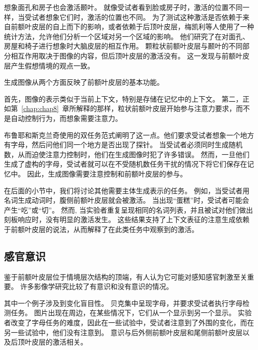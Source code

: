想象面孔和房子也会激活颞叶。
就像受试者看到脸或房子时，激活的位置不同一样，当受试者想象它们时，激活的位置也不同\cite{ishai2000distributed}。
为了测试这种激活是否依赖于来自前额叶皮层的自上而下的影响，或者依赖于后顶叶皮层，梅凯利等人\cite{mechelli2004bottom}使用了一种统计方法，允许他们分析一个区域对另一个区域的影响。
他们研究了在对面孔、房屋和椅子进行想象时大脑皮层的相互作用。
颗粒状前额叶皮层与颞叶的不同部分相互作用取决于图像的内容，但后顶叶皮层的激活没有。
这一发现与前额叶皮层产生假想情境的观点一致。
\par


生成图像从两个方面反映了前额叶皮层的基本功能。
\par


首先，图像的表示类似于当前上下文，特别是存储在记忆中的上下文。
第二，正如第~\ref{chap:chap8}~章所解释的那样，粒状前额叶皮层开始参与注意力要求，而不是自动控制行为，而想象需要注意力。
\par


布鲁耶和斯克兰奇\cite{bruyer1998visuospatial}使用的双任务范式阐明了这一点。他们要求受试者想象一个地方有字母，然后问他们同一个地方是否出现了探针\cite{kosslyn1995cognitive}。
当受试者必须同时生成随机数，从而迫使注意力控制时，他们在生成图像时犯了许多错误。
然而，一旦他们生成了虚构的字母，受试者就可以在不受随机数任务干扰的情况下将它们保存在记忆中。
因此，生成图像需要注意控制和前额叶皮层的参与。
\par


在后面的小节中，我们将讨论其他需要主体生成表示的任务。
例如，当受试者用名词生成动词时，腹侧前额叶皮层就会被激活。
当出现“蛋糕”时，受试者可能会产生“吃”或“切”。
然而, 当实验者重复呈现相同的名词列表，并且被试对他们做出刻板响应时，没有明显的激活发生\cite{raichle1994practice}。
这些结果支持了上下文表征的注意生成依赖于前额叶皮层的说法，从而解释了在此类任务中观察到的激活。



\subsection{感官意识}

鉴于前额叶皮层位于情境层次结构的顶端，有人认为它可能对感知感官刺激至关重要\cite{crick1998consciousness}。
许多影像学研究比较了有意识和没有意识的情况\cite{rees2002neural}。
\par


其中一个例子涉及到变化盲目性。
贝克\cite{beck2001neural}集中呈现字母，并要求受试者执行字母检测任务。
图片出现在周边，在某些情况下，它们从一个显示到另一个显示。
实验者改变了字母任务的难度，因此在一些试验中，受试者注意到了外围的变化，而在另一些试验中，他们没有注意到。
意识与后外侧前额叶皮层和尾侧前额叶皮层以及后顶叶皮层的激活相关。
\par



